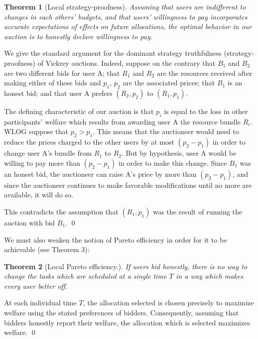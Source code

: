 \documentclass{acm_proc_article-sp}
\newtheorem{theorem}{Theorem}[section]
\newenvironment{pproof}[1][Proof]{\begin{trivlist}
\item[\hskip \labelsep {\bfseries #1}]}{\end{trivlist}}
\begin{document}
\vspace{-8mm}
\begin{theorem}[Local strategy-proofness] 
Assuming that users are indifferent to changes in each others' budgets,
and that users' willingness to pay 
incorporates accurate expectations of effects on future allocations, 
the optimal behavior in our auction is to honestly declare willingness to pay.
\end{theorem}
\vspace{-7mm}
\begin{pproof}
We give the standard argument for the dominant strategy truthfulness (strategy-proofness) of Vickrey auctions. 
Indeed, suppose on the contrary 
that $B_1$ and $B_2$ are two different bids for user A; that $R_1$ and $R_2$ are the resources received after making either of these bids and $p_1$, $p_2$ are the associated prices; that $B_1$ is an honest bid; and that user A prefers $(R_2, p_2)$ to $(R_1, p_1)$.

The defining characteristic of our auction is that $p_i$ is equal to the loss in other participants' welfare which results from awarding user A the resource bundle $R_i$. 
WLOG suppose that $p_2> p_1$.
This means that the auctioneer would need to reduce the prices charged to the other users by at most $(p_2 - p_1)$ in order to change user A's bundle from $R_1$ to $R_2$. 
But by hypothesis, user A would be willing to pay more than $(p_2 - p_1)$ in order to make this change. 
Since $B_1$ was an honest bid, the auctioneer can raise A's price by more than $(p_2 - p_1)$, 
and since the auctioneer continues to make favorable modifications until no more are available, it will do so.

This contradicts the assumption that $(R_1, p_1)$ was the result of running the auction with bid $B_1$. \qed 
\end{pproof}
\vspace{-5mm}
We must also weaken the notion of Pareto efficiency in order for it to be achievable (see Theorem 3):
\vspace{-5mm}
\begin{theorem}[Local Pareto efficiency.]
If users bid honestly, 
there is no way to change the tasks which are scheduled at a single time $T$ in a way which makes every user better off.
\end{theorem}
\vspace{-5mm}
\begin{pproof}
At each individual time $T$, the allocation selected is chosen precisely to maximize welfare using the stated preferences of bidders. 
Consequently, assuming that bidders honestly report their welfare, the allocation which is selected maximizes welfare. \qed
\end{pproof}
\end{document}
